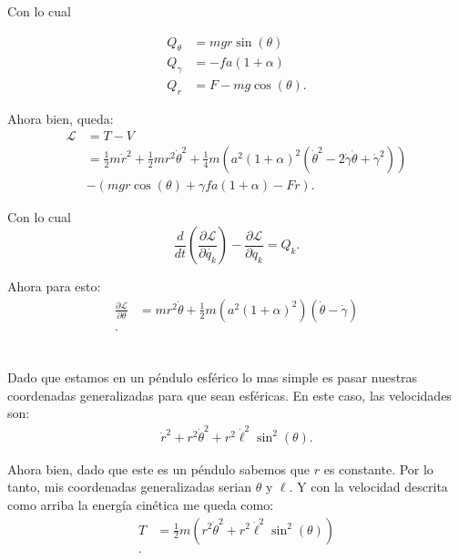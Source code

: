 \documentclass{report}
\begin{document}
Con lo cual

\begin{align*}
  Q_\theta &= mgr\sin\left( \theta \right)  \\
  Q_\gamma &= - fa\left( 1 + \alpha \right)  \\
  Q_r &= F - mg\cos\left( \theta \right)
.\end{align*}

Ahora bien, queda:
\begin{align*}
  \mathcal{L} &= T - V \\
  &=  \frac{1}{2}m\dot{r}^2 + \frac{1}{2}m r^2\dot{\theta}^2 +\frac{1}{4}m \left( a^2 \left( 1 + \alpha \right)^2 \left( \dot{\theta}^2 - 2\dot{\gamma}\dot{\theta} + \dot{\gamma}^2 \right)  \right)\\
  &- \left( mgr\cos\left( \theta \right) + \gamma fa\left( 1 + \alpha \right) - Fr \right) 
.\end{align*}

Con lo cual \[
  \frac{d}{dt}\left( \frac{\partial \mathcal{L}}{\partial \dot{q_k}}  \right) - \frac{\partial \mathcal{L}}{\partial q_k} = Q_k
.\] 

Ahora para esto:
\begin{align*}
  \frac{\partial \mathcal{L}}{\partial \theta} &= mr^2\dot{\theta} + \frac{1}{2}m\left( a^2\left( 1 + \alpha \right)^2 \right)\left( \dot{\theta} - \dot{\gamma} \right)  \\
.\end{align*}


\chapter{}

Dado que estamos en un péndulo esférico lo mas simple es pasar nuestras coordenadas generalizadas para que sean esféricas. En este caso, las velocidades son:
\begin{align*}
  \dot{r}^2 + r^2\dot{\theta}^2 + r^2\dot{\ell}^2\sin^2\left( \theta \right) 
.\end{align*}

Ahora bien, dado que este es un péndulo sabemos que $r$ es constante. Por lo tanto, mis coordenadas generalizadas serian $\theta$ y $\ell$. Y con la velocidad descrita como arriba la energía cinética me queda como:
\begin{align*}
  T &= \frac{1}{2}m\left( r^2\dot{\theta}^2 + r^2\dot{\ell}^2\sin^2\left( \theta \right)  \right)  \\
.\end{align*}
\end{document}
